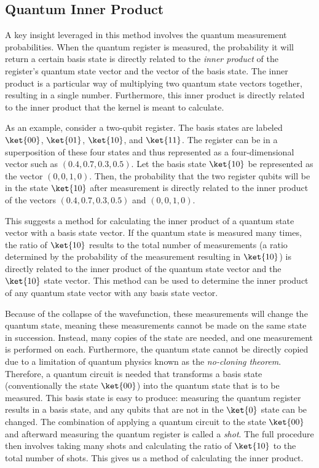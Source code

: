\documentclass[%
 reprint,
nofootinbib,
 amsmath,amssymb,
 aps,
]{revtex4-2}
\begin{document}
\subsection{Quantum Inner Product}

A key insight leveraged in this method involves the quantum measurement probabilities. When the quantum register is measured, the probability it will return a certain basis state is directly related to the \textit{inner product} of the register's quantum state vector and the vector of the basis state. The inner product is a particular way of multiplying two quantum state vectors together, resulting in a single number. Furthermore, this inner product is directly related to the inner product that the kernel is meant to calculate.

As an example, consider a two-qubit register. The basis states are labeled $\ket{00}$, $\ket{01}$, $\ket{10}$, and $\ket{11}$. The register can be in a superposition of these four states and thus represented as a four-dimensional vector such as $(0.4, 0.7, 0.3, 0.5)$. Let the basis state $\ket{10}$ be represented as the vector $(0,0, 1,0)$. Then, the probability that the two register qubits will be in the state $\ket{10}$ after measurement is directly related to the inner product of the vectors $(0.4, 0.7, 0.3, 0.5)$ and $(0,0,1,0)$.

This suggests a method for calculating the inner product of a quantum state vector with a basis state vector. If the quantum state is measured many times, the ratio of $\ket{10}$ results to the total number of measurements (a ratio determined by the probability of the measurement resulting in $\ket{10}$) is directly related to the inner product of the quantum state vector and the $\ket{10}$ state vector. This method can be used to determine the inner product of any quantum state vector with any basis state vector.

Because of the collapse of the wavefunction, these measurements will change the quantum state, meaning these measurements cannot be made on the same state in succession. Instead, many copies of the state are needed, and one measurement is performed on each. Furthermore, the quantum state cannot be directly copied due to a limitation of quantum physics known as the \textit{no-cloning theorem}. Therefore, a quantum circuit is needed that transforms a basis state (conventionally the state $\ket{00}$) into the quantum state that is to be measured. This basis state is easy to produce: measuring the quantum register results in a basis state, and any qubits that are not in the $\ket{0}$ state can be changed. The combination of applying a quantum circuit to the state $\ket{00}$ and afterward measuring the quantum register is called a \textit{shot}. The full procedure then involves taking many shots and calculating the ratio of $\ket{10}$ to the total number of shots. This gives us a method of calculating the inner product.
\end{document}
